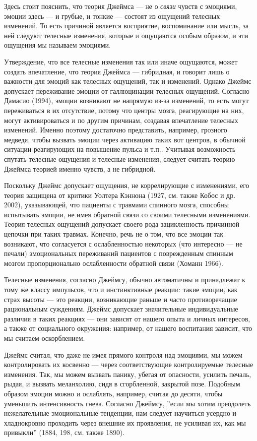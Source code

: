 \documentclass[11pt]{book}
\begin{document}
Здесь стоит пояснить, что теория Джеймса --- не о \textit{связи} чувств с эмоциями, эмоции здесь --- и грубые, и тонкие --- состоят из ощущений телесных изменений. То есть причиной является восприятие, воспоминание или мысль, за ней следуют телесные изменения, которые и ощущаются особым образом, и эти ощущения мы называем эмоциями.

Утверждение, что все телесные изменения так или иначе ощущаются, может создать впечатление, что теория Джеймса --- гибридная, и говорит лишь о важности для эмоций как телесных ощущений, так и изменений. Однако Джеймс допускает переживание эмоции от галлюцинации телесных ощущений. Согласно Дамасио (1994), эмоции возникают не напрямую из-за изменений, то есть могут переживаться в их отсутствие, потому что центры мозга, реагирующие на них, могут активироваться и по другим причинам, создавая впечатление телесных изменений. Именно поэтому достаточно представить, например, грозного медведя, чтобы вызвать эмоции через активацию таких вот центров, в обычной ситуации реагирующих на повышение пульса и т.п.. Учитывая возможность спутать телесные ощущения и телесные изменения, следует считать теорию Джеймса теорией именно чувств, а не гибридной.

Поскольку Джеймс допускает ощущения, не коррелирующие с изменениями, его теория защищена от критики Уолтера Кэннона (1927, см. также Кобос и др. 2002), указывающей, что пациенты с травмами спинного мозга, способны испытывать эмоции, не имея обратной связи со своими телесными изменениями. Теория телесных ощущений допускает своего рода зацикленность причинной цепочки при таких травмах. Конечно, речь не о том, что все эмоции так возникают, что согласуется с ослабленностью некоторых (что интересно --- не печали) эмоциональных переживаний пациентов с поврежденным спинным мозгом пропорционально ослабленности обратной связи (Хоманн 1966).

Телесные изменения, согласно Джеймсу, обычно автоматичны и принадлежат к тому же классу импульсов, что и инстинктивные реакции: такие эмоции, как страх высоты --- это реакции, возникающие раньше и часто противоречащие рациональным суждениям. Джеймс допускает значительные индивидуальные различия в таких реакциях --- они зависят от нашего опыта и личных интересов, а также от социального окружения: например, от нашего воспитания зависит, что мы считаем оскорблением.

Джеймс считал, что даже не имея прямого контроля над эмоциями, мы можем контролировать их косвенно --- через соответствующие контролируемые телесные изменения. Так, мы можем вызвать панику, убегая от опасности, усилить печаль, рыдая, и вызвать меланхолию, сидя в сгорбленной, закрытой позе. Подобным образом эмоции можно и ослаблять, например, считая до десяти, чтобы уменьшить интенсивность гнева. Согласно Джеймсу, ''если мы хотим преодолеть нежелательные эмоциональные тенденции, нам следует научиться усердно и хладнокровно проходить через внешние их проявления, не усиливая их, как мы привыкли'' (1884, 198, см. также 1890).
\end{document}
